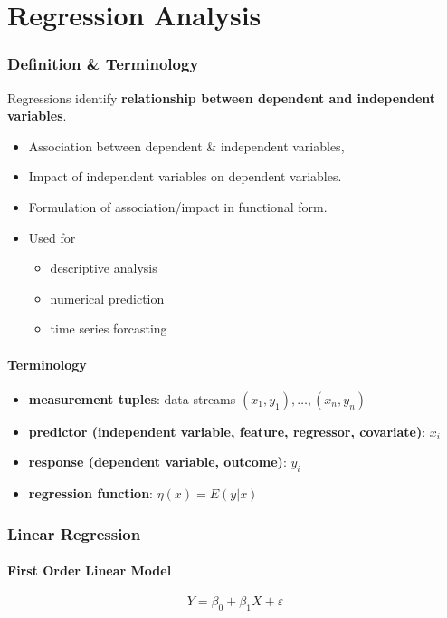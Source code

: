 \newpage
\part{Regression Analysis}
\section{Definition \& Terminology}
Regressions identify \textbf{relationship between dependent and independent variables}.
\begin{itemize}
	\item Association between dependent \& independent variables, 
	\item Impact of independent variables on dependent variables.
	\item Formulation of association/impact in functional form.
	\item Used for 
	\begin{itemize}
		\item descriptive analysis
		\item numerical prediction
		\item time series forcasting
	\end{itemize}
\end{itemize} 
\subsection*{Terminology}
\begin{itemize}
	\item \textbf{measurement tuples}: data streams  $(x_1,y_1), \dots, (x_n,y_n)$
	\item \textbf{predictor (independent variable, feature, regressor, covariate)}: $x_i$
	\item \textbf{response (dependent variable, outcome)}: $y_i$
	\item \textbf{regression function}: $\eta(x) = E(y|x)$
\end{itemize}






\section{Linear Regression}
\subsection{First Order Linear Model}

$$Y = \beta_0 + \beta_1 X + \varepsilon$$


